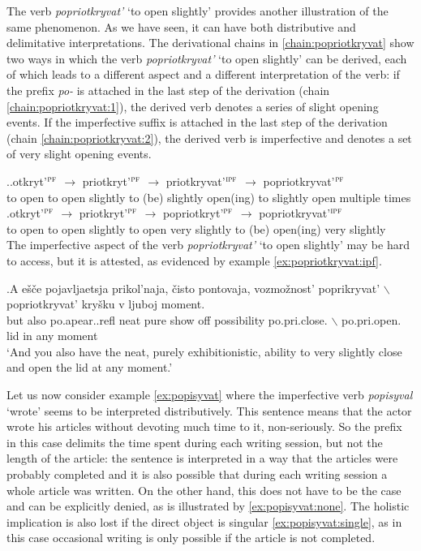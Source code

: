 The verb \textit{popriotkryvat'} `to open slightly' provides another illustration of the same phenomenon. As we have seen, it can have both distributive and delimitative interpretations. The derivational chains in \ref{chain:popriotkryvat} show two ways in which the verb \textit{popriotkryvat'} `to open slightly' can be derived, each of which leads to a different aspect and a different interpretation of the verb: if the prefix \textit{po-} is attached in the last step of the derivation (chain \ref{chain:popriotkryvat:1}), the derived verb denotes a series of slight opening events. If the imperfective suffix is attached in the last step of the derivation (chain \ref{chain:popriotkryvat:2}), the derived verb is imperfective and denotes a set of very slight opening events. 

\ex.\label{chain:popriotkryvat}\ag.\label{chain:popriotkryvat:1}otkryt'$^{\textsc{pf}}$ $\rightarrow$ priotkryt'$^{\textsc{pf}}$ $\rightarrow$ priotkryvat'$^{\textsc{ipf}}$ $\rightarrow$ popriotkryvat'$^{\textsc{pf}}$\\
{to open} {} {to open slightly} {} {to (be) slightly open(ing)} {} {to slightly open multiple times}\\
\bg.\label{chain:popriotkryvat:2}otkryt'$^{\textsc{pf}}$ $\rightarrow$ priotkryt'$^{\textsc{pf}}$ $\rightarrow$ popriotkryt'$^{\textsc{pf}}$ $\rightarrow$ popriotkryvat'$^{\textsc{ipf}}$\\
{to open} {} {to open slightly} {} {to open very slightly} {} {to (be) open(ing) very slightly}\\

The imperfective aspect of the verb \textit{popriotkryvat'} `to open slightly' may be hard to access, but it is attested, as evidenced by example \ref{ex:popriotkryvat:ipf}. 

\exg.\label{ex:popriotkryvat:ipf}A e\v{s}\v{c}e pojavljaetsja prikol'naja, \v{c}isto pontovaja, vozmo\v{z}nost' poprikryvat' {$\backslash$} popriotkryvat' kry\v{s}ku v ljuboj moment.\\
but also po.apear..refl neat pure {show off} possibility po.pri.close. {$\backslash$} po.pri.open. lid in any moment\\
`And you also have the neat, purely exhibitionistic, ability to very slightly close and open the lid at any moment.'

Let us now consider example \ref{ex:popisyvat} where the imperfective verb \textit{popisyval} `wrote' seems to be interpreted distributively. This sentence means that the actor wrote his articles without devoting much time to it, non-seriously. So the prefix in this case delimits the time spent during each writing session, but not the length of the article: the sentence is interpreted in a way that the articles were probably completed and it is also possible that during each writing session a whole article was written. On the other hand, this does not have to be the case and can be explicitly denied, as is illustrated by \ref{ex:popisyvat:none}. The holistic implication is also lost if the direct object is singular \ref{ex:popisyvat:single}, as in this case occasional writing is only possible if the article is not completed. 

